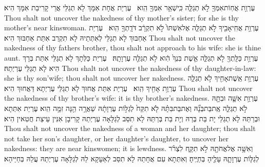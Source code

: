 {עֶרְוַ֥ת אֲחֽוֹת\maqqaf אִמְּךָ֖ לֹ֣א תְגַלֵּ֑ה כִּֽי\maqqaf שְׁאֵ֥ר אִמְּךָ֖ הִֽוא׃ \setuma }
{עֶרְיַת אֲחָת אִמָּךְ לָא תְגַלֵּי אֲרֵי קָרִיבַת אִמָּךְ הִיא׃}
{Thou shalt not uncover the nakedness of thy mother’s sister; for she is thy mother’s near kinswoman.}{}
{עֶרְוַ֥ת אֲחִֽי\maqqaf אָבִ֖יךָ לֹ֣א תְגַלֵּ֑ה אֶל\maqqaf אִשְׁתּוֹ֙ לֹ֣א תִקְרָ֔ב דֹּדָֽתְךָ֖ הִֽוא׃ \setuma }
{עֶרְיַת אַחְבּוּךְ לָא תְגַלֵּי לְאִתְּתֵיהּ לָא תִקְרַב אִתַּת אַחְבּוּךְ הִיא׃}
{Thou shalt not uncover the nakedness of thy fathers brother, thou shalt not approach to his wife: she is thine aunt.}{}
{עֶרְוַ֥ת כַּלָּֽתְךָ֖ לֹ֣א תְגַלֵּ֑ה אֵ֤שֶׁת בִּנְךָ֙ הִ֔וא לֹ֥א תְגַלֶּ֖ה עֶרְוָתָֽהּ׃ \setuma }
{עֶרְיַת כַּלְּתָךְ לָא תְגַלֵּי אִתַּת בְּרָךְ הִיא לָא תְגַלֵּי עֶרְיְתַהּ׃}
{Thou shalt not uncover the nakedness of thy daughter-in-law: she is thy son’wife; thou shalt not uncover her nakedness.}{}
{עֶרְוַ֥ת אֵֽשֶׁת\maqqaf אָחִ֖יךָ לֹ֣א תְגַלֵּ֑ה עֶרְוַ֥ת אָחִ֖יךָ הִֽוא׃ \setuma }
{עֶרְיַת אִתַּת אֲחוּךְ לָא תְגַלֵּי עֶרְיְתָא דַּאֲחוּךְ הִיא׃}
{Thou shalt not uncover the nakedness of thy brother’s wife: it is thy brother’s nakedness.}{}
{עֶרְוַ֥ת אִשָּׁ֛ה וּבִתָּ֖הּ לֹ֣א תְגַלֵּ֑ה אֶֽת\maqqaf בַּת\maqqaf בְּנָ֞הּ וְאֶת\maqqaf בַּת\maqqaf בִּתָּ֗הּ לֹ֤א תִקַּח֙ לְגַלּ֣וֹת עֶרְוָתָ֔הּ שַׁאֲרָ֥ה הֵ֖נָּה זִמָּ֥ה הִֽוא׃}
{עֶרְיַת אִתְּתָא וּבְרַתַּהּ לָא תְגַלֵּי יָת בַּת בְּרַהּ וְיָת בַּת בְּרַתַּהּ לָא תִסַּב לְגַלָּאָה עֶרְיְתַהּ קָרִיבָן אִנִּין עֵיצַת חֲטִאין הִיא׃}
{Thou shalt not uncover the nakedness of a woman and her daughter; thou shalt not take her son’s daughter, or her daughter’s daughter, to uncover her nakedness: they are near kinswomen; it is lewdness.}{}
{וְאִשָּׁ֥ה אֶל\maqqaf אֲחֹתָ֖הּ לֹ֣א תִקָּ֑ח לִצְרֹ֗ר לְגַלּ֧וֹת עֶרְוָתָ֛הּ עָלֶ֖יהָ בְּחַיֶּֽיהָ׃}
{וְאִתְּתָא עִם אֲחָתַהּ לָא תִסַּב לְאַעָקָא לַהּ לְגַלָּאָה עֶרְיְתַהּ עֲלַהּ בְּחַיַּיהָא׃}
